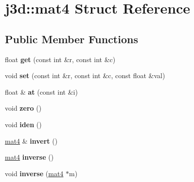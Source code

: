 \hypertarget{structj3d_1_1mat4}{}\section{j3d\+:\+:mat4 Struct Reference}
\label{structj3d_1_1mat4}
\subsection*{Public Member Functions}
\begin{DoxyCompactItemize}
\item 
\hypertarget{structj3d_1_1mat4_a56f35bdc345aaa44b6aeebb0cf1ab5b5}{}float {\bfseries get} (const int \&r, const int \&c)\label{structj3d_1_1mat4_a56f35bdc345aaa44b6aeebb0cf1ab5b5}

\item 
\hypertarget{structj3d_1_1mat4_a4acf4de8b23af2dc83c51903687416aa}{}void {\bfseries set} (const int \&r, const int \&c, const float \&val)\label{structj3d_1_1mat4_a4acf4de8b23af2dc83c51903687416aa}

\item 
\hypertarget{structj3d_1_1mat4_a40cd857e569497a08b23b361a7243d0d}{}float \& {\bfseries at} (const int \&i)\label{structj3d_1_1mat4_a40cd857e569497a08b23b361a7243d0d}

\item 
\hypertarget{structj3d_1_1mat4_a7aa70b303ee99806515439eb1b7cf448}{}void {\bfseries zero} ()\label{structj3d_1_1mat4_a7aa70b303ee99806515439eb1b7cf448}

\item 
\hypertarget{structj3d_1_1mat4_a71898d110967c8765eab35dda0478db9}{}void {\bfseries iden} ()\label{structj3d_1_1mat4_a71898d110967c8765eab35dda0478db9}

\item 
\hypertarget{structj3d_1_1mat4_a9f0cc218b95a55a9d0e54cc47286595e}{}\hyperlink{structj3d_1_1mat4}{mat4} \& {\bfseries invert} ()\label{structj3d_1_1mat4_a9f0cc218b95a55a9d0e54cc47286595e}

\item 
\hypertarget{structj3d_1_1mat4_a8acfa6d69b75310a4aac587829f1abd7}{}\hyperlink{structj3d_1_1mat4}{mat4} {\bfseries inverse} ()\label{structj3d_1_1mat4_a8acfa6d69b75310a4aac587829f1abd7}

\item 
\hypertarget{structj3d_1_1mat4_ad093d6001bddef5b63f1521d051f89e6}{}void {\bfseries inverse} (\hyperlink{structj3d_1_1mat4}{mat4} $\ast$m)\label{structj3d_1_1mat4_ad093d6001bddef5b63f1521d051f89e6}


\end{DoxyCompactItemize}
